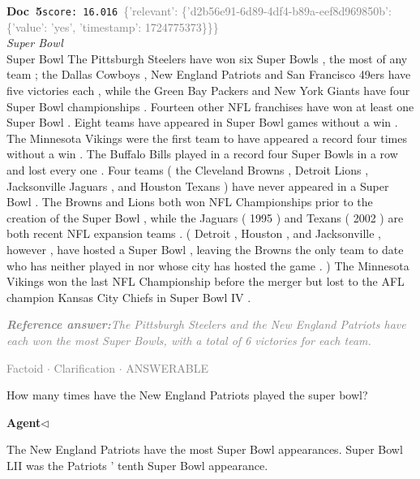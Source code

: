 \documentclass[a4paper,11pt]{article}
\begin{document}
\begin{docenv}
{\footnotesize\textcolor{doccolor}{\textbf{Doc~5}}}\hfill{\tiny\texttt{score:~16.016}}\ {\tiny\textcolor{gray}{\{'relevant': \{'d2b56e91-6d89-4df4-b89a-eef8d969850b': \{'value': 'yes', 'timestamp': 1724775373\}\}\}}}\\[3pt]
{\small\textit{Super Bowl}}\\[2pt]
\vspace{2pt}
{\footnotesize Super Bowl
The Pittsburgh Steelers have won six Super Bowls , the most of any team ; the Dallas Cowboys , New England Patriots and San Francisco 49ers have five victories each , while the Green Bay Packers and New York Giants have four Super Bowl championships . Fourteen other NFL franchises have won at least one Super Bowl . Eight teams have appeared in Super Bowl games without a win . The Minnesota Vikings were the first team to have appeared a record four times without a win . The Buffalo Bills played in a record four Super Bowls in a row and lost every one . Four teams ( the Cleveland Browns , Detroit Lions , Jacksonville Jaguars , and Houston Texans ) have never appeared in a Super Bowl . The Browns and Lions both won NFL Championships prior to the creation of the Super Bowl , while the Jaguars ( 1995 ) and Texans ( 2002 ) are both recent NFL expansion teams . ( Detroit , Houston , and Jacksonville , however , have hosted a Super Bowl , leaving the Browns the only team to date who has neither played in nor whose city has hosted the game . ) The Minnesota Vikings won the last NFL Championship before the merger but lost to the AFL champion Kansas City Chiefs in Super Bowl IV .}
\end{docenv}
\begin{refanswerenv}
{\footnotesize\textit{\textcolor{gray}{\textbf{Reference answer:}\enspace The Pittsburgh Steelers and the New England Patriots have each won the most Super Bowls, with a total of 6 victories for each team.}}}
\end{refanswerenv}
\vspace{0.5em}
\hfill{\tiny\textcolor{gray}{Factoid $\cdot$ Clarification $\cdot$ ANSWERABLE}}
\begin{userbubble}
How many times have the New England Patriots played the super bowl?
\end{userbubble}
\noindent\hfill{\small\textcolor{agentcolor}{\textbf{Agent\enspace$\triangleleft$}}}
\begin{agentbubble}
The New England Patriots have the most Super Bowl appearances. Super Bowl LII was the Patriots ' tenth Super Bowl appearance.
\end{agentbubble}
\end{document}
